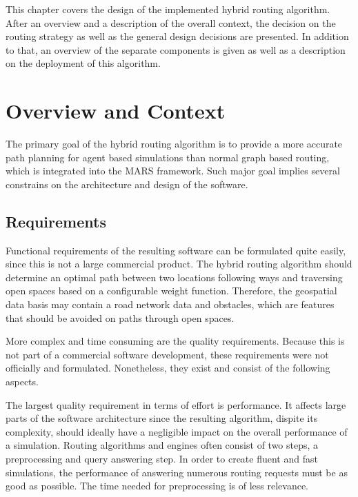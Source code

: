 
This chapter covers the design of the implemented hybrid routing algorithm.
After an overview and a description of the overall context, the decision on the routing strategy as well as the general design decisions are presented.
In addition to that, an overview of the separate components is given as well as a description on the deployment of this algorithm.

\section{Overview and Context}

	The primary goal of the hybrid routing algorithm is to provide a more accurate path planning for agent based simulations than normal graph based routing, which is integrated into the MARS framework.
	Such major goal implies several constrains on the architecture and design of the software.
	
	\subsection{Requirements}
	
		Functional requirements of the resulting software can be formulated quite easily, since this is not a large commercial product.
		The hybrid routing algorithm should determine an optimal path between two locations following ways and traversing open spaces based on a configurable weight function.
		Therefore, the geospatial data basis may contain a road network data and obstacles, which are features that should be avoided on paths through open spaces.
		
		More complex and time consuming are the quality requirements.
		Because this is not part of a commercial software development, these requirements were not officially and formulated.
		Nonetheless, they exist and consist of the following aspects.
	
		The largest quality requirement in terms of effort is performance.
		It affects large parts of the software architecture since the resulting algorithm, dispite its complexity, should ideally have a negligible impact on the overall performance of a simulation.
		Routing algorithms and engines often consist of two steps, a preprocessing and query answering step.
		In order to create fluent and fast simulations, the performance of answering numerous routing requests must be as good as possible.
		The time needed for preprocessing is of less relevance.
		

